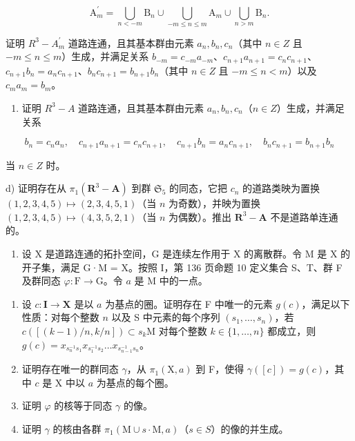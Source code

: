 \[
\mathrm{A} _ {m} ^ {\prime} = \bigcup_ {n <   - m} \mathrm{B} _ {n} \cup \bigcup_ {- m \leqslant n \leqslant m} \mathrm{A} _ {m} \cup \bigcup_ {n > m} \mathrm{B} _ {n}.
\]

证明 \(R^{3}-A_{m}^{\prime}\) 道路连通，且其基本群由元素 \(a_{n}, b_{n}, c_{n}\)（其中 \(n \in Z\) 且 \(-m \leqslant n \leqslant m\)）生成，并满足关系 \(b_{-m} = c_{-m}a_{-m}\)、\(c_{n+1}a_{n+1} = c_{n}c_{n+1}\)、\(c_{n+1}b_{n} = a_{n}c_{n+1}\)、\(b_{n}c_{n+1} = b_{n+1}b_{n}\)（其中 \(n \in Z\) 且 \(-m \leqslant n < m\)）以及 \(c_{m}a_{m} = b_{m}\)。

\begin{enumerate}
\def\labelenumi{\alph{enumi})}
\setcounter{enumi}{2}
\tightlist
\item
   证明 \(R^{3}-A\) 道路连通，且其基本群由元素 \(a_{n}, b_{n}, c_{n}\)（\(n \in Z\)）生成，并满足关系
\end{enumerate}

\[
b _ {n} = c _ {n} a _ {n}, \quad c _ {n + 1} a _ {n + 1} = c _ {n} c _ {n + 1}, \quad c _ {n + 1} b _ {n} = a _ {n} c _ {n + 1}, \quad b _ {n} c _ {n + 1} = b _ {n + 1} b _ {n}
\]

 当 \(n \in Z\) 时。

d) 证明存在从 \(\pi_1(\mathbf{R}^3 -\mathbf{A})\) 到群 \(\mathfrak{S}_5\) 的同态，它把 \(c_{n}\) 的道路类映为置换 \((1,2,3,4,5)\mapsto (2,3,4,5,1)\)（当 \(n\) 为奇数），并映为置换 \((1,2,3,4,5)\mapsto (4,3,5,2,1)\)（当 \(n\) 为偶数）。推出 \(\mathbf{R}^3 -\mathbf{A}\) 不是道路单连通的。

\begin{enumerate}
\def\labelenumi{\arabic{enumi})}
\setcounter{enumi}{33}
\tightlist
\item
  设 X 是道路连通的拓扑空间，G 是连续左作用于 X 的离散群。令 M 是 X 的开子集，满足 G·M = X。按照 I，第 136 页命题 10 定义集合 S、T、群 F 及群同态 \(\varphi\colon\mathrm{F}\to\mathrm{G}\)。令 \(a\) 是 M 中的一点。
\end{enumerate}

\begin{enumerate}
\def\labelenumi{\alph{enumi})}
\item
  设 \(c\colon\mathbf{I}\to\mathbf{X}\) 是以 \(a\) 为基点的圈。证明存在 F 中唯一的元素 \(g(c)\)，满足以下性质：对每个整数 \(n\) 以及 S 中元素的每个序列 \((s_{1},\ldots,s_{n})\)，若 \(c([(k-1)/n,k/n])\subset s_{k}\mathrm{M}\) 对每个整数 \(k\in\{1,\ldots,n\}\) 都成立，则 \(g(c)=x_{s_{n}^{-1}s_{1}}x_{s_{1}^{-1}s_{2}}\ldots x_{s_{n-1}^{-1}s_{n}}\)。
\item
  证明存在唯一的群同态 \(\gamma\)，从 \(\pi_1(\mathrm{X},a)\) 到 F，使得 \(\gamma ([c]) = g(c)\)，其中 \(c\) 是 X 中以 \(a\) 为基点的每个圈。
\item
  证明 \(\varphi\) 的核等于同态 \(\gamma\) 的像。
\item
  证明 \(\gamma\) 的核由各群 \(\pi_{1}(\mathrm{M}\cup s\cdot\mathrm{M},a)\)（\(s\in S\)）的像的并生成。
\end{enumerate}

